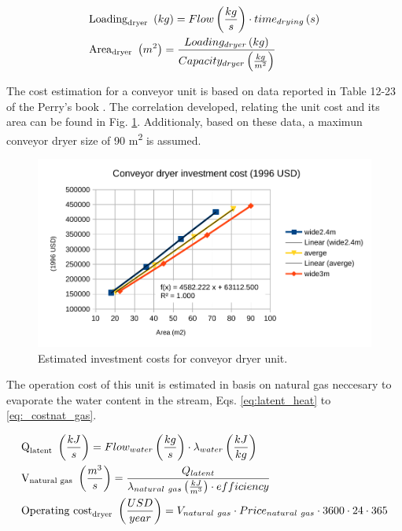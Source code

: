 \documentclass[10pt,a4paper]{article}
\begin{document}
\begin{align} 
& \text{\text{Loading}}_{\text{dryer}} \ \left(kg\right) = Flow \left( \frac{kg}{s} \right) \cdot time_{drying} \left( s\right) \label{eq:dryer_loading} \\
& \text{\text{Area}}_{\text{dryer}} \ \left(m^2\right) = \frac{Loading_{dryer}\left(kg\right)}{Capacity_{dryer} \left(\frac{kg}{m^2}\right)} \label{eq:dryer_area}
\end{align}

The cost estimation for a conveyor unit is based on data reported in Table 12-23 of the Perry's book \cite{Perry}. The correlation developed, relating the unit cost and its area can be found in Fig. \ref{fig:converyor_dryer_investment_cost}. Additionaly, based on these data, a maximun conveyor dryer size of 90 m\textsuperscript{2} is assumed.
\begin{figure}[H]
	\centering
	\includegraphics[width=0.6\linewidth]{converyor_dryer_investment_cost} 
	\caption{Estimated investment costs for conveyor dryer unit.}
	\label{fig:converyor_dryer_investment_cost}
\end{figure}

The operation cost of this unit is estimated in basis on natural gas neccesary to evaporate the water content in the stream, Eqs. \ref{eq:latent_heat} to \ref{eq:_costnat_gas}.

\begin{align} 
& \text{\text{Q}}_{\text{latent}} \ \left(\frac{kJ}{s}\right) = Flow_{water} \left( \frac{kg}{s} \right) \cdot \lambda_{water} \left( \frac{kJ}{kg}\right) \label{eq:latent_heat} \\
& \text{\text{V}}_{\text{natural gas}} \ \left(\frac{m^3}{s}\right) = \frac{Q_{latent}}{\lambda_{natural \ gas}\left( \frac{kJ}{m^3}\right) \cdot efficiency} \label{eq:nat_gas} \\
& \text{\text{Operating cost}}_{\text{dryer}} \ \left(\frac{USD}{year}\right) = V_{natural \ gas} \cdot Price_{natural \ gas} \cdot 3600 \cdot 24 \cdot 365 \label{eq:_costnat_gas} \\
\end{align}
\end{document}

